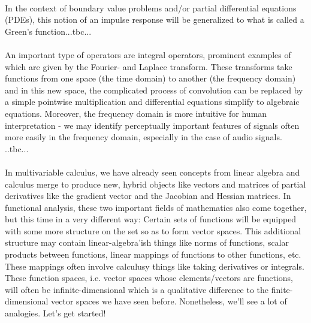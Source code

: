 \paragraph{}
In the context of boundary value problems and/or partial differential equations (PDEs), this notion of an impulse response will be generalized to what is called a Green's function...tbc...

\paragraph{}
An important type of operators are integral operators, prominent examples of which are given by the Fourier- and Laplace transform. These transforms take functions from one space (the time domain) to another (the frequency domain) and in this new space, the complicated process of convolution can be replaced by a simple pointwise multiplication and differential equations simplify to algebraic equations. Moreover, the frequency domain is more intuitive for human interpretation - we may identify perceptually important features of signals often more easily in the frequency domain, especially in the case of audio signals.
..tbc...

\paragraph{}
In multivariable calculus, we have already seen concepts from linear algebra and calculus merge to produce new, hybrid objects like vectors and matrices of partial derivatives like the gradient vector and the Jacobian and Hessian matrices. In functional analysis, these two important fields of mathematics also come together, but this time in a very different way: Certain sets of functions will be equipped with some more structure on the set so as to form vector spaces. This additional structure may contain linear-algebra'ish things like norms of functions, scalar products between functions, linear mappings of functions to other functions, etc. These mappings often involve calculusy things like taking derivatives or integrals. These function spaces, i.e. vector spaces whose elements/vectors are functions, will often be infinite-dimensional which is a qualitative difference to the finite-dimensional vector spaces we have seen before. Nonetheless, we'll see a lot of analogies. Let's get started!

\begin{comment}

In multivriable calculus, we collected objects from calculus, like functions and derivative operators, into vectors and matrices. Here, we do something very different: the functions themselves \emph{are} our vectors and the matrices are replaced by the operators which map functions (vectors) to other functions.

-integral transforms (fourier- and laplace trafo)
-greens-functions
-calculus of variations
-operators: eigenvalues, eigenfunctions


\end{comment}